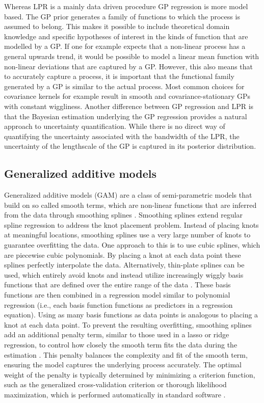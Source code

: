 \documentclass[man, floatsintext]{apa7}
\begin{document}
Whereas LPR is a mainly data driven procedure GP regression is more model
based. The GP prior generates a family of functions to which the process is
assumed to belong. This makes it possible to include theoretical domain
knowledge and specific hypotheses of interest in the kinds of function that are
modelled by a GP\@. If one for example expects that a non-linear process has
a general upwards trend, it would be possible to model a linear mean function
with non-linear deviations that are captured by a GP\@. However,
this also means that to accurately capture a process, it is important that the
functional family generated by a GP is similar to the actual process. Most
common choices for covariance kernels for example result in smooth and
covariance-stationary GPs with constant wiggliness. Another difference between
GP regression and LPR is that the Bayesian estimation underlying the GP
regression provides a natural approach to uncertainty quantification. While
there is no direct way of quantifying the uncertainty associated with the
bandwidth of the LPR, the uncertainty of the lengthscale of the GP is captured
in its posterior distribution.

\subsection{Generalized additive models}

Generalized additive models (GAM) are a class of semi-parametric models that
build on so called smooth terms, which are non-linear functions that are
inferred from the data through smoothing splines
\parencite{wood_generalized_2006, wood_inference_2020,
  hastie_generalized_1999}. Smoothing splines extend regular spline regression
to
address the knot placement problem. Instead of placing knots at meaningful
locations, smoothing splines use a very large number of knots to guarantee
overfitting the data. One approach to this is to use cubic splines, which are
piecewise cubic polynomials. By placing a knot at each data point these splines
perfectly interpolate the data. Alternatively, thin-plate splines can be used,
which entirely avoid knots and instead utilize increasingly wiggly basis
functions that are defined over the entire range of the data
\parencite{wood_thin_2003}. These basis functions are then combined in a
regression model similar to polynomial regression (i.e., each basis function
functions as predictors in a regression equation). Using as many basis
functions as data points is analogous to placing a knot at each data point. To
prevent the resulting overfitting, smoothing splines add an additional penalty
term, similar to those used in a lasso or ridge regression, to control how
closely the smooth term fits the data during the estimation
\parencite{gu_smoothing_2013, wahba_spline_1980}. This penalty balances the
complexity and fit of the smooth term, ensuring the model captures the
underlying process accurately. The optimal weight of the penalty is typically
determined by minimizing a criterion function, such as the generalized
cross-validation criterion or thorough likelihood maximization, which is
performed automatically in standard software \parencite{wood_generalized_2006,
  golub_generalized_1997}.
\end{document}
